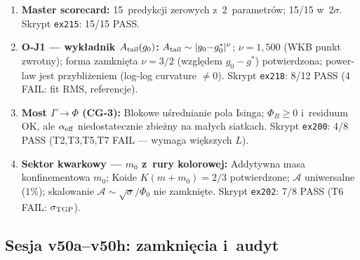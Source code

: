 \begin{remark}
\begin{enumerate}[nosep]
  \item \textbf{Master scorecard:}
    15~predykcji zerowych z~2~parametr\'ow; 15/15 w~$2\sigma$.
    Skrypt \texttt{ex215}: 15/15 PASS\@.

  \item \textbf{O-J1 --- wyk\l{}adnik $A_{\rm tail}(g_0)$:}
    $A_{\rm tail} \sim |g_0{-}g_0^*|^\nu$; $\nu = 1{,}500$ (WKB punkt zwrotny);
    forma zamkni\k{e}ta $\nu = 3/2$ (wzgl\k{e}dem $g_0{-}g^*$) potwierdzona;
    power-law jest przybli\.zeniem (log-log curvature $\neq 0$).
    Skrypt \texttt{ex218}: 8/12 PASS (4 FAIL: fit RMS, referencje).

  \item \textbf{Most $\Gamma \to \Phi$ (CG-3):}
    Blokowe u\'srednianie pola Isinga; $\Phi_B \geq 0$ i~residuum OK,
    ale $\alpha_{\rm eff}$ niedostatecznie zbie\.zny na ma\l{}ych siatkach.
    Skrypt \texttt{ex200}: 4/8 PASS (T2,T3,T5,T7 FAIL --- wymaga wi\k{e}kszych $L$).

  \item \textbf{Sektor kwarkowy --- $m_0$ z~rury kolorowej:}
    Addytywna masa konfinementowa $m_0$; Koide $K(m{+}m_0) = 2/3$
    potwierdzone; $\mathcal{A}$ uniwersalne ($1\%$);
    skalowanie $\mathcal{A} \sim \sqrt{\sigma}/\Phi_0$ nie zamkni\k{e}te.
    Skrypt \texttt{ex202}: 7/8 PASS (T6 FAIL: $\sigma_{\rm TGP}$).
\end{enumerate}
\end{remark}

\subsection*{Sesja v50a--v50h: zamkni\k{e}cia i~audyt}

